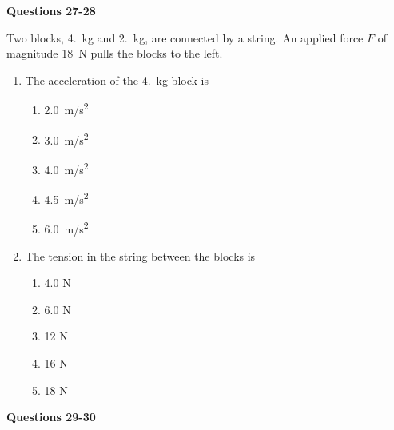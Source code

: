\documentclass{../../oss-apphys}
\begin{document}
\begin{multicols}{2}
\begin{enumerate}[resume,leftmargin=18pt]
  \end{enumerate}
  
  \textbf{Questions 27-28}

  Two blocks, \SI{4.}{\kilo\gram} and \SI{2.}{\kilo\gram}, are connected by a
  string. An applied force $F$ of magnitude \SI{18}{\newton} pulls the blocks
  to the left.
  \begin{center}
  \end{center}
  
  \begin{enumerate}[resume,leftmargin=18pt]
    
  \item The acceleration of the \SI{4.}{\kilo\gram} block is
    \begin{enumerate}[noitemsep,topsep=0pt,leftmargin=18pt,label=(\Alph*)]
    \item\SI{2.0}{m/s^2}
    \item\SI{3.0}{m/s^2}
    \item\SI{4.0}{m/s^2}
    \item\SI{4.5}{m/s^2}
    \item\SI{6.0}{m/s^2}
    \end{enumerate}

  \item The tension in the string between the blocks is
    \begin{enumerate}[noitemsep,topsep=0pt,leftmargin=18pt,label=(\Alph*)]
    \item 4.0 N
    \item 6.0 N
    \item 12 N
    \item 16 N
    \item 18 N
    \end{enumerate}
  \end{enumerate}
  \columnbreak
  
  \textbf{Questions 29-30}


\end{multicols}
\end{document}
